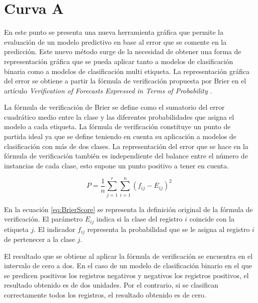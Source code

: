 \section{Curva A}

En este punto se presenta una nueva herramienta gráfica que permite la evaluación de un modelo predictivo en base al error que se comente en la predicción. Este nuevo método surge de la necesidad de obtener una forma de representación gráfica que se pueda aplicar tanto a modelos de clasificación binaria como a modelos de clasificación multi etiqueta. La representación gráfica del error se obtiene a partir la fórmula de verificación propuesta por Brier en el artículo \textit{Verification of Forecasts Expressed in Terms of Probability} \cite{brie_1950}.

\bigbreak

La fórmula de verificación de Brier se define como el sumatorio del error cuadrático medio entre la clase y las diferentes probabilidades que asigna el modelo a cada etiqueta. La fórmula de verificación constituye un punto de partida ideal ya que se define teniendo en cuenta su aplicación a modelos de clasificación con más de dos clases. La representación del error que se hace en la fórmula de verificación también es independiente del balance entre el número de instancias de cada clase, esto supone un punto positivo a tener en cuenta.

\bigbreak

\begin{equation}
    P = \frac{1}{n}\sum_{j=1}^{r}\sum_{i=1}^{n}{(f_{ij}-E_{ij})^{2}}
    \label{eq:BrierScore}
\end{equation}

\bigbreak


En la ecuación \ref{eq:BrierScore} se representa la definición original de la fórmula de verificación. El parámetro $E_{ij}$ indica si la clase del registro $i$ coincide con la etiqueta $j$. El indicador $f_{ij}$ representa la probabilidad que se le asigna al registro $i$ de pertenecer a la clase $j$.

\bigbreak

El resultado que se obtiene al aplicar la fórmula de verificación se encuentra en el intervalo de cero a dos. En el caso de un modelo de clasificación binario en el que se predicen positivos los registros negativos y negativos los registros positivos, el resultado obtenido es de dos unidades. Por el contrario, si se clasifican correctamente todos los registros, el resultado obtenido es de cero.

